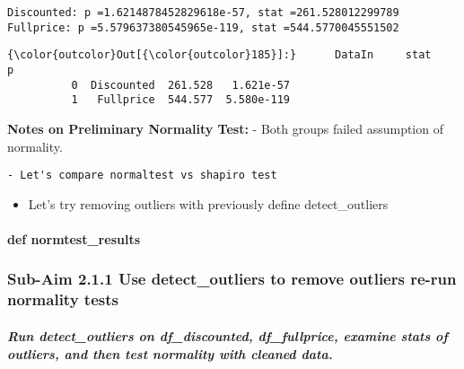 \documentclass[11pt]{article}
\providecommand{\tightlist}{%
      \setlength{\itemsep}{0pt}\setlength{\parskip}{0pt}}
\begin{document}
    \begin{Verbatim}[commandchars=\\\{\}]
Discounted: p =1.6214878452829618e-57, stat =261.528012299789
Fullprice: p =5.579637380545965e-119, stat =544.5770045551502

    \end{Verbatim}

\begin{Verbatim}[commandchars=\\\{\}]
{\color{outcolor}Out[{\color{outcolor}185}]:}      DataIn     stat         p    
          0  Discounted  261.528   1.621e-57
          1   Fullprice  544.577  5.580e-119
\end{Verbatim}
            
    \textbf{Notes on Preliminary Normality Test:} - Both groups failed
assumption of normality.

\begin{verbatim}
- Let's compare normaltest vs shapiro test
\end{verbatim}

\begin{itemize}
\tightlist
\item
  Let's try removing outliers with previously define detect\_outliers
\end{itemize}

    \hypertarget{def-normtest_results}{%
\paragraph{def normtest\_results}\label{def-normtest_results}}

    \hypertarget{sub-aim-2.1.1-use-detect_outliers-to-remove-outliers-re-run-normality-tests}{%
\subsubsection{Sub-Aim 2.1.1 Use detect\_outliers to remove outliers
re-run normality
tests}\label{sub-aim-2.1.1-use-detect_outliers-to-remove-outliers-re-run-normality-tests}}

    \hypertarget{run-detect_outliers-on-df_discounted-df_fullprice-examine-stats-of-outliers-and-then-test-normality-with-cleaned-data.}{%
\subparagraph{Run detect\_outliers on df\_discounted, df\_fullprice,
examine stats of outliers, and then test normality with cleaned
data.}\label{run-detect_outliers-on-df_discounted-df_fullprice-examine-stats-of-outliers-and-then-test-normality-with-cleaned-data.}}
\end{document}
